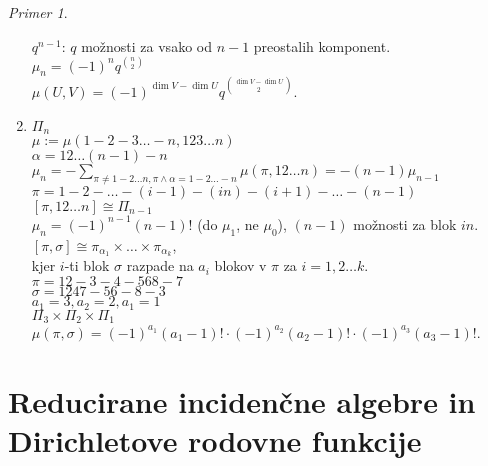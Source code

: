 \documentclass[a4paper, 12pt]{book}
\theoremstyle{definition}
\theoremstyle{remark}
\newtheorem*{ex}{Primer}
\begin{document}
\begin{ex}
\begin{enumerate}[label=(\alph*)]
      $q^{n-1}$: $q$ možnosti za vsako od $n-1$ preostalih komponent. \\
      $\mu_n = (-1)^n q^{\binom{n}{2}}$ \\
      $\mu(U, V) = (-1)^{\dim V - \dim U} q^{\binom{\dim V - \dim U}{2}}$.
    \item $\Pi_n$ \\
      $\mu := \mu(1-2-3 \dots -n, 123 \dots n)$ \\
      $\alpha = 1 2 \dots (n-1)-n$ \\
      $\mu_n = -\sum_{\pi \neq 1-2 \dots n, \pi \land \alpha = 1-2 \dots -n} \mu(\pi, 12 \dots n) = -(n-1) \mu_{n-1}$ \\
      $\pi = 1-2- \dots -(i-1)-(in)-(i+1)- \dots -(n-1)$ \\
      $[\pi, 12 \dots n] \cong \Pi_{n-1}$ \\
      $\mu_n = (-1)^{n-1} (n-1)!$ (do $\mu_1$, ne $\mu_0$), $(n-1)$ možnosti za blok $in$. \\
      $[\pi, \sigma] \cong \pi_{\alpha_1} \times \dots \times \pi_{\alpha_k}$, \\
      kjer $i$-ti blok $\sigma$ razpade na $a_i$ blokov v $\pi$ za $i = 1, 2 \dots k$. \\
      $\pi = 12-3-4-568-7$ \\
      $\sigma = 1247-56-8-3$ \\
      $a_1 = 3, a_2 = 2, a_1 = 1$ \\
      $\Pi_3 \times \Pi_2 \times \Pi_1$ \\
      $\mu(\pi, \sigma) = (-1)^{a_1} (a_1 - 1)! \cdot (-1)^{a_2} (a_2 - 1)! \cdot (-1)^{a_3} (a_3 - 1)!$.
  \end{enumerate}
\end{ex}


\section{Reducirane incidenčne algebre in Dirichletove rodovne funkcije}
\end{document}
